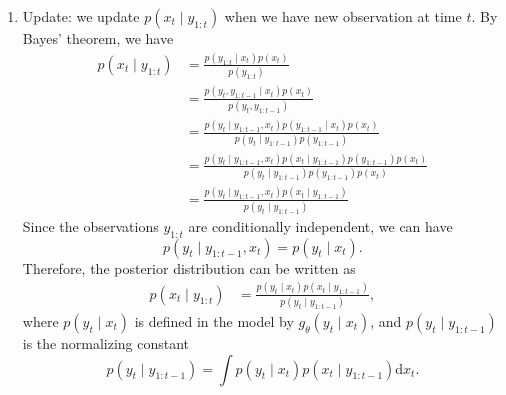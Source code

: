\documentclass[mstat,12pt]{unswthesis}  %
\numberwithin{equation}{section}
\begin{document}
\begin{enumerate}
    \item Update: we update 
    $p\left(x_{t} \mid y_{1:t}\right)$ when we have new observation at time $t$. By Bayes' theorem, we have\\
    \begin{equation}\begin{aligned}
    p\left(x_{t}\mid y_{1:t} \right) &=\frac{p\left(y_{1:t} \mid x_{t}\right) p\left(x_{t}\right)}{p\left(y_{1:t}\right)} \\
    &=\frac{p\left(y_{t}, y_{1:t-1}\mid x_{t}\right) p\left(x_{t}\right)}{p\left(y_{t}, y_{1:t-1}\right)}
    \\
    &=\frac{p\left(y_{t} \mid y_{1:t-1}, x_{t}\right) p\left(y_{1: t-1}\mid x_{t}\right) p\left(x_{t}\right)}{p\left(y_{t} \mid y_{1: t-1}\right) p\left(y_{1: t-1}\right)}
    \\
    &=\frac{p\left(y_{t} \mid y_{1: t-1}, x_{t}\right) p\left(x_{t} \mid y_{1: t-1}\right) p\left(y_{1: t-1}\right) p\left(x_{t}\right)}{p\left(y_{t} \mid y_{1: t-1}\right) p\left(y_{1: t-1}\right) p\left(x_{t}\right)}
    \\
    &=\frac{p\left(y_{t} \mid y_{1:t-1}, x_{t}\right) p\left(x_{t} \mid y_{1: t-1}\right)}{p\left(y_{t} \mid y_{1: t-1}\right)}
    \end{aligned}\end{equation}
    \noindent Since the observations $y_{1:t}$ are conditionally independent, we can have
    \begin{equation}
        p\left(y_{t} \mid y_{1:t-1}, x_{t}\right)=
        p\left(y_{t} \mid x_{t}\right).
    \end{equation}
    \noindent Therefore, the posterior distribution can be
    written as 
    \begin{equation}\label{update}
    \begin{aligned}
        p\left(x_{t}\mid y_{1:t} \right) &=
        \frac{p\left(y_{t} \mid  x_{t}\right) p\left(x_{t} \mid y_{1: t-1}\right)}{p\left(y_{t} \mid y_{1: t-1}\right)},
    \end{aligned}
    \end{equation}
    where $p\left(y_{t} \mid  x_{t}\right)$ is defined in
    the model by $g_{\theta}\left(y_{t} \mid x_{t}\right)$,
    and $p\left(y_{t} \mid y_{1: t-1}\right)$ is the
    normalizing constant
    \begin{equation}
        p\left(y_{t} \mid y_{1: t-1}\right)=
        \int p\left(y_{t} \mid x_{t}\right) p\left(x_{t} \mid y_{1: t-1}\right) \mathrm{d} x_{t}.
    \end{equation}
\end{enumerate}
\end{document}
